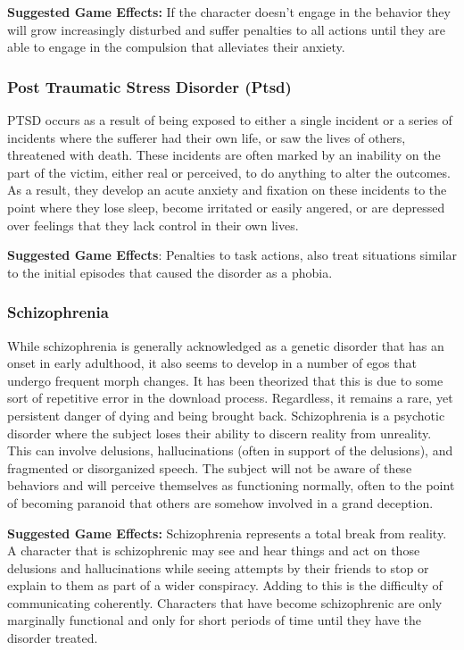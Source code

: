 \textbf{Suggested Game Effects: }If the character doesn't 
engage in the behavior they will grow increasingly 
disturbed and suffer penalties to all actions until they 
are able to engage in the compulsion that alleviates 
their anxiety.

\subsubsection{Post Traumatic Stress Disorder (Ptsd)}

PTSD occurs as a result of being exposed to either 
a single incident or a series of incidents where the 
sufferer had their own life, or saw the lives of others, 
threatened with death. These incidents are often 
marked by an inability on the part of the victim, either 
real or perceived, to do anything to alter the outcomes. 
As a result, they develop an acute anxiety and fixation 
on these incidents to the point where they lose sleep, 
become irritated or easily angered, or are depressed 
over feelings that they lack control in their own lives.

\textbf{Suggested Game Effects}: Penalties to task actions, 
also treat situations similar to the initial episodes that 
caused the disorder as a phobia.

\subsubsection{Schizophrenia}

While schizophrenia is generally acknowledged as a 
genetic disorder that has an onset in early adulthood, 
it also seems to develop in a number of egos that undergo
frequent morph changes. It has been theorized
that this is due to some sort of repetitive error in the 
download process. Regardless, it remains a rare, yet 
persistent danger of dying and being brought back. 
Schizophrenia is a psychotic disorder where the subject
loses their ability to discern reality from unreality.
This can involve delusions, hallucinations (often in 
support of the delusions), and fragmented or disorganized
speech. The subject will not be aware of these
behaviors and will perceive themselves as functioning 
normally, often to the point of becoming paranoid that 
others are somehow involved in a grand deception.

\textbf{Suggested Game Effects: }Schizophrenia represents 
a total break from reality. A character that is schizophrenic
may see and hear things and act on those
delusions and hallucinations while seeing attempts 
by their friends to stop or explain to them as part 
of a wider conspiracy. Adding to this is the difficulty 
of communicating coherently. Characters that have 
become schizophrenic are only marginally functional 
and only for short periods of time until they have the 
disorder treated.

